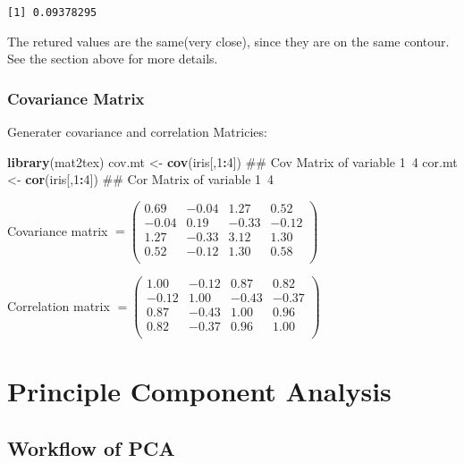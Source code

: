 \documentclass[]{book}
\newenvironment{Shaded}{\begin{snugshade}}{\end{snugshade}}
\newcommand{\KeywordTok}[1]{\textcolor[rgb]{0.13,0.29,0.53}{\textbf{#1}}}
\newcommand{\DecValTok}[1]{\textcolor[rgb]{0.00,0.00,0.81}{#1}}
\newcommand{\StringTok}[1]{\textcolor[rgb]{0.31,0.60,0.02}{#1}}
\newcommand{\OperatorTok}[1]{\textcolor[rgb]{0.81,0.36,0.00}{\textbf{#1}}}
\newcommand{\NormalTok}[1]{#1}
\theoremstyle{definition}
\theoremstyle{definition}
\theoremstyle{definition}
\theoremstyle{remark}
\begin{document}
\begin{verbatim}
[1] 0.09378295
\end{verbatim}

The retured values are the same(very close), since they are on the same
contour. See the section \protect\hypertarget{data-generation}{}{above}
for more details.

\subsection{Covariance Matrix}\label{covariance-matrix}

Generater covariance and correlation Matricies:

\begin{Shaded}
\begin{Highlighting}[]
\KeywordTok{library}\NormalTok{(mat2tex)}
\NormalTok{cov.mt <-}\StringTok{ }\KeywordTok{cov}\NormalTok{(iris[,}\DecValTok{1}\OperatorTok{:}\DecValTok{4}\NormalTok{]) ## Cov Matrix of variable 1~4}
\NormalTok{cor.mt <-}\StringTok{ }\KeywordTok{cor}\NormalTok{(iris[,}\DecValTok{1}\OperatorTok{:}\DecValTok{4}\NormalTok{]) ## Cor Matrix of variable 1~4}
\end{Highlighting}
\end{Shaded}

Covariance matrix
\(= \begin{pmatrix}  0.69 & -0.04 & 1.27 & 0.52 \\  -0.04 & 0.19 & -0.33 & -0.12 \\  1.27 & -0.33 & 3.12 & 1.30 \\  0.52 & -0.12 & 1.30 & 0.58 \\  \end{pmatrix}\)

Correlation matrix
\(= \begin{pmatrix}  1.00 & -0.12 & 0.87 & 0.82 \\  -0.12 & 1.00 & -0.43 & -0.37 \\  0.87 & -0.43 & 1.00 & 0.96 \\  0.82 & -0.37 & 0.96 & 1.00 \\  \end{pmatrix}\)

\chapter{Principle Component Analysis}\label{PCA}

\section{Workflow of PCA}\label{workflow-of-pca}
\end{document}

